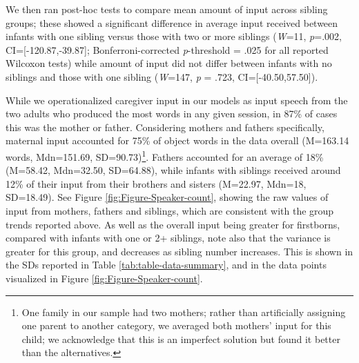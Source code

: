 \documentclass[
  man,mask,floatsintext]{apa6}
\begin{document}
We then ran post-hoc tests to compare mean amount of input across sibling groups; these showed a significant difference in average input received between infants with one sibling versus those with two or more siblings (\emph{W}=11, \emph{p}=.002, CI={[}-120.87,-39.87{]}; Bonferroni-corrected \emph{p}-threshold = .025 for all reported Wilcoxon tests) while amount of input did not differ between infants with no siblings and those with one sibling (\emph{W}=147, \emph{p} = .723, CI={[}-40.50,57.50{]}).

While we operationalized caregiver input in our models as input speech from the two adults who produced the most words in any given session, in 87\% of cases this was the mother or father. Considering mothers and fathers specifically, maternal input accounted for 75\% of object words in the data overall (M=163.14 words, Mdn=151.69, SD=90.73)\footnote{One family in our sample had two mothers; rather than artificially assigning one parent to another category, we averaged both mothers' input for this child; we acknowledge that this is an imperfect solution but found it better than the alternatives.}. Fathers accounted for an average of 18\% (M=58.42, Mdn=32.50, SD=64.88), while infants with siblings received around 12\% of their input from their brothers and sisters (M=22.97, Mdn=18, SD=18.49). See Figure \ref{fig:Figure-Speaker-count}, showing the raw values of input from mothers, fathers and siblings, which are consistent with the group trends reported above. As well as the overall input being greater for firstborns, compared with infants with one or 2+ siblings, note also that the variance is greater for this group, and decreases as sibling number increases. This is shown in the SDs reported in Table \ref{tab:table-data-summary}, and in the data points visualized in Figure \ref{fig:Figure-Speaker-count}.
\end{document}
